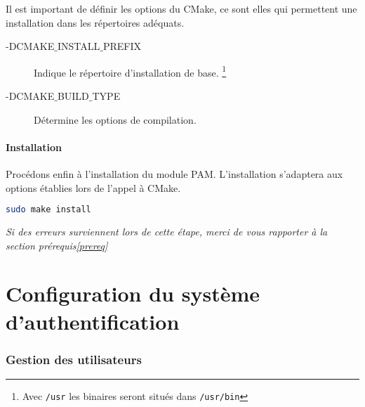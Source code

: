 \documentclass{"../../../res/univ-projet"}
\begin{document}
Il est important de définir les options du CMake, ce sont elles qui permettent une installation dans les
répertoires adéquats.
\begin{description}
\item[-DCMAKE$\_$INSTALL$\_$PREFIX] Indique le répertoire d'installation de base. 
\footnote{Avec \verb?/usr? les binaires seront situés dans \verb?/usr/bin?}
\item[-DCMAKE$\_$BUILD$\_$TYPE] Détermine les options de compilation.
\end{description}

\subsection{Installation}
Procédons enfin à l'installation du module PAM. L'installation s'adaptera 
aux options établies lors de l'appel à CMake.
\begin{lstlisting}[language=bash, backgroundcolor=\color{black}, basicstyle=\color{white}]
sudo make install
\end{lstlisting}

\textit{Si des erreurs surviennent lors de cette étape, merci de vous 
rapporter à la section prérequis\ref{prereq}}


\newpage

\part{Configuration du système d'authentification}
\section{Gestion des utilisateurs}
\end{document}
